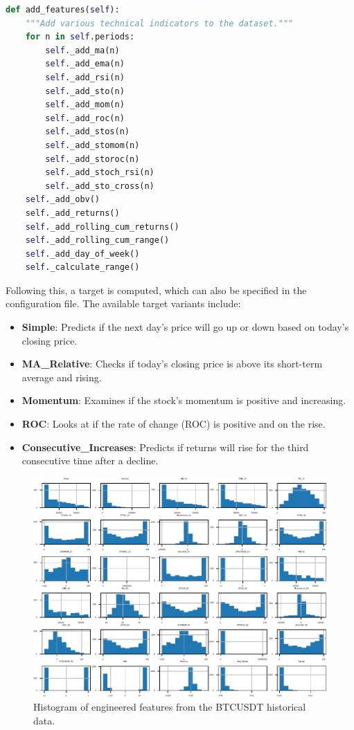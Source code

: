 \begin{lstlisting}[style=pythonstyle, language=Python, caption={Function to add features to the dataset},  captionpos=b, label=lst:add_features_function]
def add_features(self):
    """Add various technical indicators to the dataset."""
    for n in self.periods:
        self._add_ma(n)
        self._add_ema(n)
        self._add_rsi(n)
        self._add_sto(n)
        self._add_mom(n)
        self._add_roc(n)
        self._add_stos(n)
        self._add_stomom(n)
        self._add_storoc(n)
        self._add_stoch_rsi(n)
        self._add_sto_cross(n)
    self._add_obv()
    self._add_returns()
    self._add_rolling_cum_returns()
    self._add_rolling_cum_range()
    self._add_day_of_week()
    self._calculate_range()

\end{lstlisting}


Following this, a target is computed, which can also be specified in the configuration file. The available target variants include:
\begin{itemize}
    \item \textbf{Simple}: Predicts if the next day's price will go up or down based on today's closing price.
    \item \textbf{MA\_Relative}: Checks if today's closing price is above its short-term average and rising.
    \item \textbf{Momentum}: Examines if the stock's momentum is positive and increasing.
    \item \textbf{ROC}: Looks at if the rate of change (ROC) is positive and on the rise.
    \item \textbf{Consecutive\_Increases}: Predicts if returns will rise for the third consecutive time after a decline.
\end{itemize}

\begin{figure}[h]
\centering
\begin{adjustbox}{max width=1\textwidth,center}
    \includegraphics[scale=1]{./pdf/dataset_histogram.pdf}
\end{adjustbox}
\caption{Histogram of engineered features from the BTCUSDT historical data.}
\label{fig:dataset_histogram}
\end{figure}

